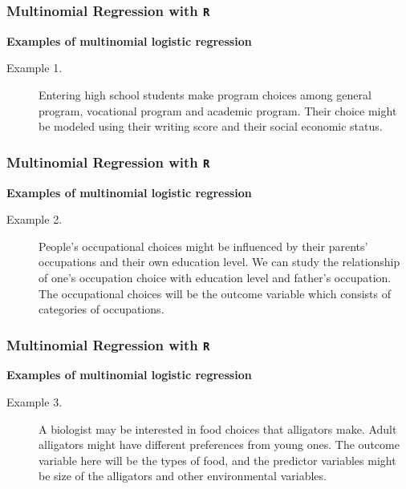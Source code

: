 \documentclass[00-GLMregslides.tex]{subfiles}
\begin{document}
\begin{frame}[fragile]
	
	\frametitle{Multinomial Regression with \texttt{R}}
	\Large
	\textbf{Examples of multinomial logistic regression}
	
	\begin{description}

		
		\item[Example 1.] Entering high school students make program choices among general program, vocational program and academic program. Their choice might be modeled using their writing score and their social economic status.
	\end{description}
\end{frame}
\begin{frame}[fragile]
	
	\frametitle{Multinomial Regression with \texttt{R}}
	\Large
	\textbf{Examples of multinomial logistic regression}
	
	\begin{description}
		\item[Example 2.] People's occupational choices might be influenced by their parents' occupations and their own education level. We can study the relationship of one's occupation choice with education level and father's occupation. The occupational choices will be the outcome variable which consists of categories of occupations. 
		

	\end{description}
\end{frame}
\begin{frame}[fragile]

\frametitle{Multinomial Regression with \texttt{R}}
\Large
\textbf{Examples of multinomial logistic regression}

\begin{description}

\item[Example 3.] A biologist may be interested in food choices that alligators make. Adult alligators might have different preferences from young ones. The outcome variable here will be the types of food, and the predictor variables might be size of the alligators and other environmental variables.
 

\end{description}
\end{frame}
\end{document}
